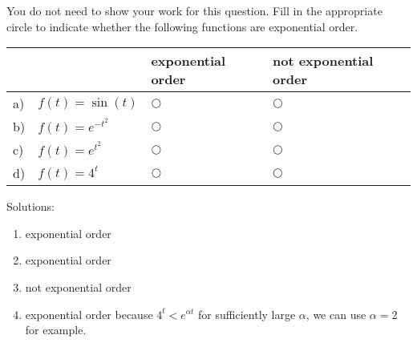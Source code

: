 \ifnum {}
\question[1] You do not need to show your work for this question. Fill in the appropriate circle to indicate whether the following functions are exponential order. 
\vspace{-0.4cm}
\setlength{\extrarowheight}{0.20cm}
\begin{center}
\hspace{-.9cm}\begin{tabular}{ p{0.20cm} p{4cm} p{3.5cm} p{4cm} }
    & & exponential order &  not exponential order  \\[2pt] \hline 
    a) & $f(t) = \sin(t) $ & $\bigcirc$  & $\bigcirc$ \\[8pt]  
    b) & $f(t) = e^{-t^2}$  & $\bigcirc$  & $\bigcirc$ \\[8pt] 
    c) & $f(t) = e^{t^2}$  & $\bigcirc$  & $\bigcirc$ \\[8pt] 
    d) & $f(t) = 4^t$  & $\bigcirc$  & $\bigcirc$ \\[8pt] 
    \hline
\end{tabular}
\end{center}
\setlength{\extrarowheight}{0.0cm}
\ifnum {} {\color{DarkBlue} Solutions: 
\begin{enumerate}[label=(\alph*)]
    \item exponential order
    \item exponential order 
    \item not exponential order
    \item exponential order because $4^t < e^{\alpha t}$ for sufficiently large $\alpha $, we can use $\alpha = 2$ for example. 
\end{enumerate}
}
\fi
\vspace{-6pt} 
\fi 




